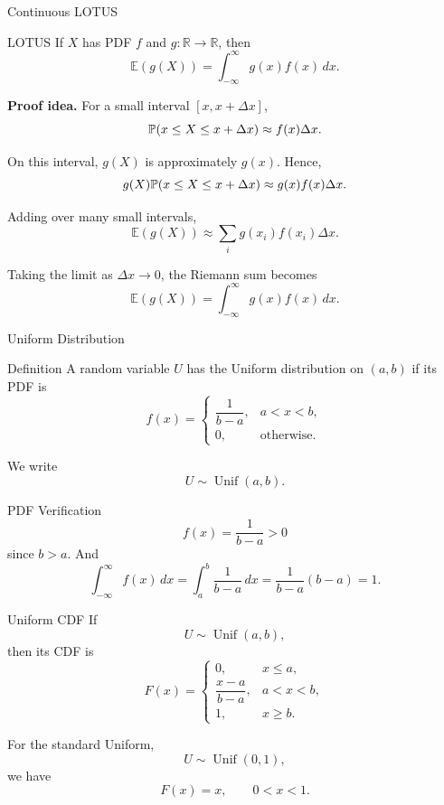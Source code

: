 \begin{frame}{Continuous LOTUS}
\begin{keybox}{LOTUS}
If \(X\) has PDF \(f\) and \(g:\mathbb{R}\to\mathbb{R}\), then
\[
\boxed{
\mathbb{E}(g(X))
=
\int_{-\infty}^{\infty} g(x)f(x)\,dx.
}
\]
\end{keybox}

\vspace{0.25cm}

\textbf{Proof idea.}
For a small interval \([x,x+\Delta x]\),
\[
\mathbb{P}(x\le X\le x+\Delta x)
\approx f(x)\Delta x.
\]

On this interval, \(g(X)\) is approximately \(g(x)\). Hence,
\[
g(X)\mathbb{P}(x\le X\le x+\Delta x)
\approx
g(x)f(x)\Delta x.
\]

Adding over many small intervals,
\[
\mathbb{E}(g(X))
\approx
\sum_i g(x_i)f(x_i)\Delta x.
\]

Taking the limit as \(\Delta x\to 0\), the Riemann sum becomes
\[
\mathbb{E}(g(X))
=
\int_{-\infty}^{\infty} g(x)f(x)\,dx.
\]

\end{frame}












\begin{frame}{Uniform Distribution}

\begin{keybox}{Definition}
A random variable $U$ has the Uniform distribution on $(a,b)$ if its PDF is
\[
f(x)=
\begin{cases}
\dfrac{1}{b-a}, & a<x<b,\\
0, & \text{otherwise}.
\end{cases}
\]

We write
\[
U\sim \operatorname{Unif}(a,b).
\]
\end{keybox}

\begin{keybox}{PDF Verification}
\[
f(x)=\frac{1}{b-a}>0
\]
since \(b>a\). And
\[
\int_{-\infty}^{\infty} f(x)\,dx
=
\int_a^b \frac{1}{b-a}\,dx
=
\frac{1}{b-a}(b-a)
=
1.
\]
\end{keybox}

\end{frame}

\begin{frame}{Uniform CDF}
If
\[
U\sim \operatorname{Unif}(a,b),
\]
then its CDF is
\[
F(x)=
\begin{cases}
0, & x\leq a,\\[0.1cm]
\dfrac{x-a}{b-a}, & a<x<b,\\[0.2cm]
1, & x\geq b.
\end{cases}
\]

\vspace{0.25cm}

For the standard Uniform,
\[
U\sim \operatorname{Unif}(0,1),
\]
we have
\[
F(x)=x,\qquad 0<x<1.
\]
\end{frame}

